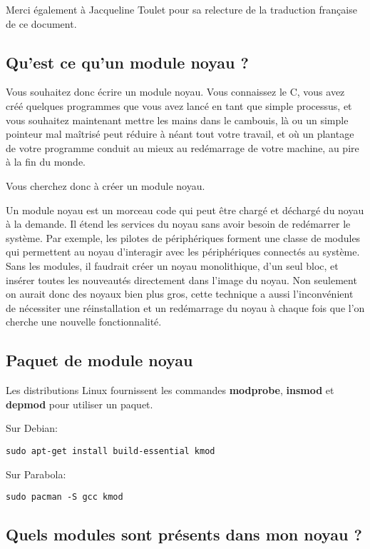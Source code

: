 \documentclass[11pt]{article}
\begin{document}
Merci également à Jacqueline Toulet pour sa relecture de la traduction française de ce document.

\subsection*{Qu'est ce qu'un module noyau ?}
\label{sec-1-4}

Vous souhaitez donc écrire un module noyau. Vous connaissez le C, vous avez créé quelques programmes que vous avez lancé en tant que simple processus, et vous souhaitez maintenant mettre les mains dans le cambouis, là ou un simple pointeur mal maîtrisé peut réduire à néant tout votre travail, et où un plantage de votre programme conduit au mieux au redémarrage de votre machine, au pire à la fin du monde.

Vous cherchez donc à créer un module noyau.

Un module noyau est un morceau code qui peut être chargé et déchargé du noyau à la demande. Il étend les services du noyau sans avoir besoin de redémarrer le système. Par exemple, les pilotes de périphériques forment une classe de modules qui permettent au noyau d'interagir avec les périphériques connectés au système. Sans les modules, il faudrait créer un noyau monolithique, d'un seul bloc, et insérer toutes les nouveautés directement dans l'image du noyau. Non seulement on aurait donc des noyaux bien plus gros, cette technique a aussi l'inconvénient de nécessiter une réinstallation et un redémarrage du noyau à chaque fois que l'on cherche une nouvelle fonctionnalité.

\subsection*{Paquet de module noyau}
\label{sec-1-5}

Les distributions Linux fournissent les commandes \textbf{modprobe}, \textbf{insmod} et \textbf{depmod} pour utiliser un paquet.

Sur Debian:

\begin{verbatim}
sudo apt-get install build-essential kmod
\end{verbatim}

Sur Parabola:

\begin{verbatim}
sudo pacman -S gcc kmod
\end{verbatim}

\subsection*{Quels modules sont présents dans mon noyau ?}
\label{sec-1-6}
\end{document}
